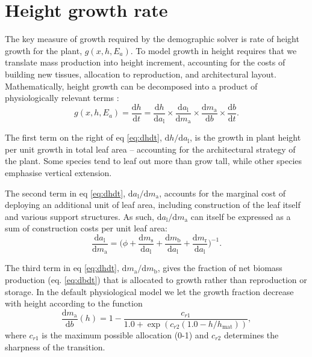 \documentclass[10pt,twoside]{article}
\begin{document}
\section{Height growth rate}\label{height-growth-rate}

The key measure of growth required by the demographic solver is 
rate of height growth for the plant, $g(x,h, E_a)$. To model growth in 
height requires that we translate mass
production into height increment, accounting for the costs of 
building new tissues, allocation
to reproduction, and architectural layout. Mathematically, height growth
can be decomposed into a product of physiologically relevant terms
\citep{Falster-2011}:
\begin{equation} \label{eq:dhdt}
g(x,h, E_a)= \frac{\textrm{d}h}{\textrm{d}t}= \frac{\textrm{d}h}{\textrm{d}a_\textrm{l}}
\times \frac{\textrm{d}a_\textrm{l}}{\textrm{d}m_\textrm{a}}
\times \frac{\textrm{d}m_\textrm{a}}{\textrm{d}b}
\times \frac{\textrm{d}b}{\textrm{d}t}.
\end{equation}

The first term on the right of eq \ref{eq:dhdt},
\(\textrm{d}h / \textrm{d}a_\textrm{l}\), is the growth in plant height
per unit growth in total leaf area -- accounting for the architectural
strategy of the plant. Some species tend to leaf out more than grow
tall, while other species emphasise vertical extension.

The second term in eq \ref{eq:dhdt},
\(\textrm{d}a_\textrm{l} / \textrm{d}m_\textrm{a}\), accounts for the
marginal cost of deploying an additional unit of leaf area, including
construction of the leaf itself and various support structures. As such,
\(\textrm{d}a_\textrm{l} / \textrm{d}m_\textrm{a}\) can itself be
expressed as a sum of construction costs per unit leaf area:
\begin{equation}\label{eq:daldmt}
\frac{\textrm{d}a_\textrm{l}}{\textrm{d}m_\textrm{a}}
= \big(\phi
 + \frac{\textrm{d}m_\textrm{s}}{\textrm{d}a_\textrm{l}} + \frac{\textrm{d}m_\textrm{b}}{\textrm{d}a_\textrm{l}} + \frac{\textrm{d}m_\textrm{r}}{\textrm{d}a_\textrm{l}}\big)^{-1}.
\end{equation}

The third term in eq \ref{eq:dhdt},
\(\textrm{d}m_\textrm{a} / \textrm{d}m_\textrm{b}\), gives the fraction
of net biomass production (eq. \ref{eq:dbdt}) that is allocated to
growth rather than reproduction or storage. In the default physiological model
we let the growth fraction decrease with height according to the function
\begin{equation}\label{eq:allocation}
\frac{\textrm{d}m_\textrm{a}}{\textrm{d}b}(h) = 1 - 
 \frac{c_{r1}} {1.0 + \exp\left(c_{r2}  \left(1.0 - h / h_\textrm{mat}\right)\right)},
\end{equation}
where $c_{r1}$ is the maximum possible allocation (0-1) and $c_{r2}$
determines the sharpness of the transition.
\end{document}
